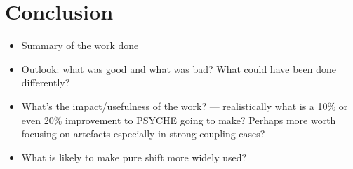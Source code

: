 \section{Conclusion}
\label{sec:pureshift__conclusion}

\begin{itemize}
    \item Summary of the work done
    \item Outlook: what was good and what was bad? What could have been done differently?
    \item What's the impact/usefulness of the work? --- realistically what is a 10\% or even 20\% improvement to PSYCHE going to make? Perhaps more worth focusing on artefacts especially in strong coupling cases?
    \item What is likely to make pure shift more widely used?
\end{itemize}

